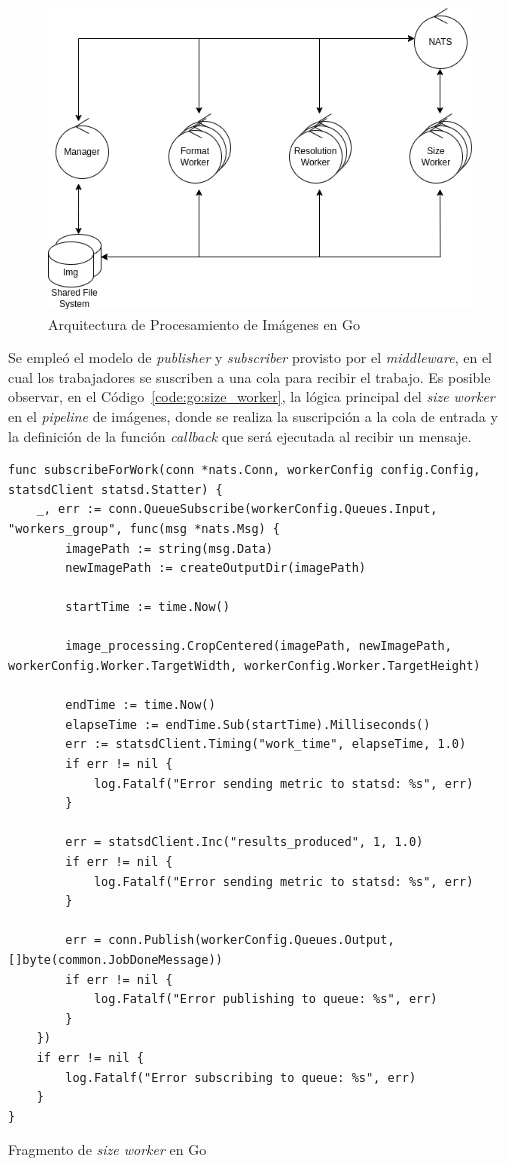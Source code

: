 \documentclass[11pt]{article}
\newcommand{\english}[1]{\textit{#1}}
\begin{document}
\begin{figure}[ht]
    \centering
    \includegraphics[scale=0.4]{resources/distributed_systems/go/image_processing_arch.png}
    \caption{Arquitectura de Procesamiento de Imágenes en Go}
    \label{fig:go:image_processing_arch}
\end{figure}

Se empleó el modelo de \english{publisher} y \english{subscriber} provisto por el \english{middleware}, en el cual los trabajadores se suscriben a una cola para recibir el trabajo. Es posible observar, en el Código~\ref{code:go:size_worker}, la lógica principal del \english{size worker} en el \english{pipeline} de imágenes, donde se realiza la suscripción a la cola de entrada y la definición de la función \english{callback} que será ejecutada al recibir un mensaje.

\begin{listing}[ht]
\begin{verbatim}
func subscribeForWork(conn *nats.Conn, workerConfig config.Config, statsdClient statsd.Statter) {
	_, err := conn.QueueSubscribe(workerConfig.Queues.Input, "workers_group", func(msg *nats.Msg) {
		imagePath := string(msg.Data)
		newImagePath := createOutputDir(imagePath)

		startTime := time.Now()

		image_processing.CropCentered(imagePath, newImagePath, workerConfig.Worker.TargetWidth, workerConfig.Worker.TargetHeight)

		endTime := time.Now()
		elapseTime := endTime.Sub(startTime).Milliseconds()
		err := statsdClient.Timing("work_time", elapseTime, 1.0)
		if err != nil {
			log.Fatalf("Error sending metric to statsd: %s", err)
		}

		err = statsdClient.Inc("results_produced", 1, 1.0)
		if err != nil {
			log.Fatalf("Error sending metric to statsd: %s", err)
		}

		err = conn.Publish(workerConfig.Queues.Output, []byte(common.JobDoneMessage))
		if err != nil {
			log.Fatalf("Error publishing to queue: %s", err)
		}
	})
	if err != nil {
		log.Fatalf("Error subscribing to queue: %s", err)
	}
}
\end{verbatim}
\caption{Fragmento de \english{size worker} en Go}
\label{code:go:size_worker}
\end{listing}
\end{document}
